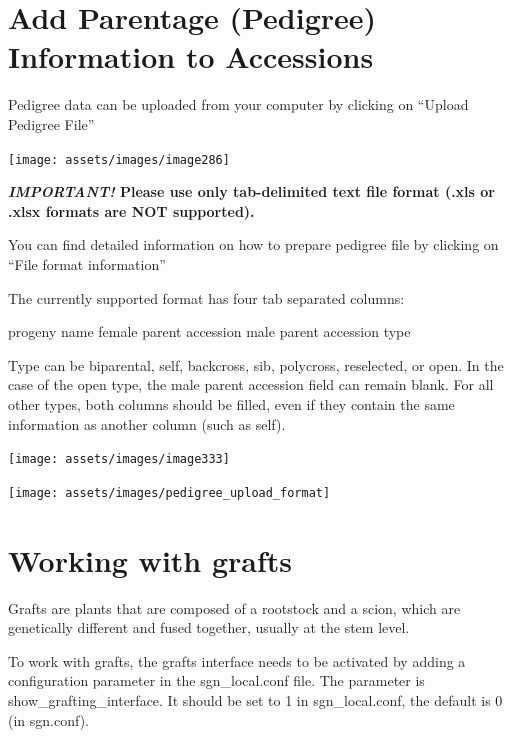 \documentclass[
  12pt,
]{book}
\begin{document}
\hypertarget{add-parentage-pedigree-information-to-accessions}{%
\section{Add Parentage (Pedigree) Information to Accessions}\label{add-parentage-pedigree-information-to-accessions}}

Pedigree data can be uploaded from your computer by clicking on ``Upload Pedigree File''

\begin{center}\texttt{[image: assets/images/image286]} \end{center}

\textbf{\emph{IMPORTANT!} Please use only tab-delimited text file format (.xls or .xlsx formats are NOT supported).}

You can find detailed information on how to prepare pedigree file by clicking on ``File format information''

The currently supported format has four tab separated columns:

progeny name female parent accession male parent accession type

Type can be biparental, self, backcross, sib, polycross, reselected, or open. In the case of the open type, the male parent accession field can remain blank. For all other types, both columns should be filled, even if they contain the same information as another column (such as self).

\begin{center}\texttt{[image: assets/images/image333]} \end{center}

\begin{center}\texttt{[image: assets/images/pedigree\_upload\_format]} \end{center}

\hypertarget{working-with-grafts}{%
\section{Working with grafts}\label{working-with-grafts}}

Grafts are plants that are composed of a rootstock and a scion, which are genetically different and fused together, usually at the stem level.

To work with grafts, the grafts interface needs to be activated by adding a configuration parameter in the sgn\_local.conf file. The parameter is show\_grafting\_interface. It should be set to 1 in sgn\_local.conf, the default is 0 (in sgn.conf).
\end{document}
